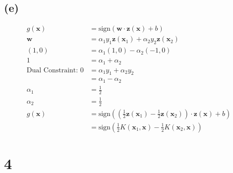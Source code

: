 \documentclass{article}
\begin{document}
	\subsection*{(e)}
		\begin{align*}
			g(\mathbf x) &= \text{sign}(\mathbf w \cdot \mathbf z(\mathbf x) + b)\\
			\mathbf w &= \alpha_1y_1\mathbf z(\mathbf x_1) + \alpha_2y_2\mathbf z(\mathbf x_2)\\
			(1, 0) &= \alpha_1(1, 0) - \alpha_2(-1, 0)\\
			1 &= \alpha_1 + \alpha_2\\
			\text{Dual Constraint: } 0 &= \alpha_1y_1 + \alpha_2y_2\\
			&= \alpha_1 - \alpha_2\\
			\alpha_1 &= \frac12\\
			\alpha_2 &= \frac12\\
			g(\mathbf x) &= \text{sign}((\frac12\mathbf z(\mathbf x_1) - \frac12\mathbf z(\mathbf x_2)) \cdot \mathbf z(\mathbf x) + b)\\
			&= \boxed{\text{sign}(\frac12 K(\mathbf x_1, \mathbf x) - \frac12 K(\mathbf x_2, \mathbf x))}
		\end{align*}
	
	\section*{4}
\end{document}
